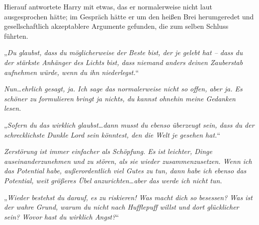 Hierauf antwortete Harry mit etwas, das er normalerweise nicht laut ausgesprochen hätte; im Gespräch hätte er um den heißen Brei herumgeredet und gesellschaftlich akzeptablere Argumente gefunden, die zum selben Schluss führten.

„\emph{Du glaubst, dass du möglicherweise der Beste bist, der je gelebt hat – dass du der stärkste Anhänger des Lichts bist, dass niemand anders deinen Zauberstab aufnehmen würde, wenn du ihn niederlegst.}“

\emph{Nun…ehrlich gesagt, ja. Ich sage das normalerweise nicht so offen, aber ja. Es schöner zu formulieren bringt ja nichts, du kannst ohnehin meine Gedanken lesen. }

„\emph{Sofern du das wirklich glaubst…dann musst du ebenso überzeugt sein, dass du der schrecklichste Dunkle Lord sein könntest, den die Welt je gesehen hat.}“

\emph{Zerstörung ist immer einfacher als Schöpfung. Es ist leichter, Dinge auseinanderzunehmen und zu stören, als sie wieder zusammenzusetzen. Wenn ich das Potential habe, außerordentlich viel Gutes zu tun, dann habe ich ebenso das Potential, weit größeres Übel anzurichten…aber das werde ich nicht tun. }

„\emph{Wieder bestehst du darauf, es zu riskieren! Was macht dich so besessen? Was ist der wahre Grund, warum du nicht nach Hufflepuff willst und dort \emph{glücklicher} sein? Wovor hast du wirklich Angst?}“

